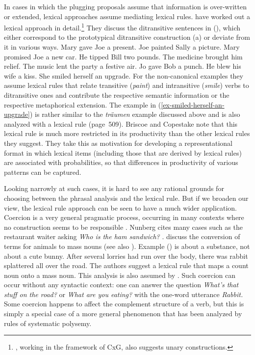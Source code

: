 In cases in which the plugging proposals assume that
information is over-written or extended, lexical approaches assume mediating lexical
rules. \citet[Section~4]{BC99a} have worked out a lexical approach in detail.\footnote{
\citet{Kay2005a}, working in the framework of CxG, also suggests unary constructions.}
They discuss the ditransitive sentences in (), which either correspond to the prototypical
ditransitive construction (a) or deviate from it in various ways.
\eal
\ex Mary gave Joe a present.
\ex\label{paint} Joe painted Sally a picture.
\ex Mary promised Joe a new car.
\ex He tipped Bill two pounds.
\ex The medicine brought him relief.
\ex The music lent the party a festive air.
\ex Jo gave Bob a punch.
\ex He blew his wife a kiss.
\ex\label{ex-smiled-herself-an-upgrade} She smiled herself an upgrade.
\zl
For the non-canonical examples they assume lexical rules that relate transitive (\emph{paint}) and intransitive (\emph{smile}) 
verbs to ditransitive ones and contribute the respective semantic information or the respective
metaphorical extension. The example in (\ref{ex-smiled-herself-an-upgrade}) is rather similar to the
\emph{träumen} example discussed above and is also analyzed with a lexical rule (page~509). Briscoe
and Copestake note that this lexical rule is much more restricted in its productivity than the other lexical
rules they suggest. They take this as motivation for developing a representational
format in which lexical items (including those that are derived by lexical rules) are
associated with probabilities, so that differences in productivity of various patterns can be captured.

Looking narrowly at such cases, it is hard to see any rational grounds for choosing between the phrasal analysis and the lexical rule.  But if we broaden our view, the lexical rule approach can be seen to have a much wider application. 
Coercion is a very general pragmatic process, occurring in many contexts where no construction seems
to be responsible  \citep{Nunberg95a-u}.  Nunberg cites many cases such as the restaurant waiter
asking \emph{Who is the ham sandwich?} \citep[]{Nunberg95a-u}.  
\citet[]{CB92a} discuss the conversion of terms for animals to mass nouns (see also \citet[--43]{CB95a-u}). Example () is about a substance, not about a cute bunny.
\ea
After several lorries had run over the body, there was rabbit splattered all over the road.
\z
The authors suggest a lexical rule that maps a count noun onto a mass noun. This analysis is also
assumed by \citet[--115]{Fillmore99a}.
Such coercion can occur without any syntactic context: one can answer the question \emph{What's that
  stuff on the road?} or \emph{What are you eating?} with the one-word utterance \emph{Rabbit.}
Some coercion happens to affect the complement structure of a verb, but this is simply a special
case of a more general phenomenon that has been analyzed by rules of systematic polysemy.      

